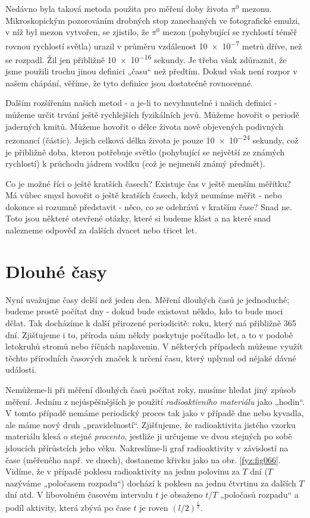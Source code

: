 {    Nedávno byla taková metoda použita pro měření doby života \(\pi^0\) mezonu. Mikroskopickým 
    pozorováním drobných stop zanechaných ve fotografické emulzi, v níž byl mezon vytvořen, se 
    zjistilo, že \(\pi^0\) mezon (pohybující se rychlostí téměř rovnou rychlostí světla) urazil v 
    průměru vzdálenost \num{10e-7} metrů dříve, než se rozpadl. Žil jen přibližně \num{10e-16} 
    sekundy. Je třeba však zdůraznit, že jsme použili trochu jinou definici „času“ než předtím. 
    Dokud však není rozpor v našem chápání, věříme, že tyto definice jsou dostatečně rovnocenné.
    
    Dalším rozšířením našich metod - a je-li to nevyhnutelné i našich definicí - můžeme určit 
    trvání ještě rychlejších fyzikálních jevů. Můžeme hovořit o periodě jaderných kmitů. Můžeme 
    hovořit o délce života nově objevených podivných rezonancí (částic). Jejich celková délka 
    života je pouze \num{10e-24} sekundy, což je přibližně doba, kterou potřebuje světlo 
    (pohybující se největší ze známých rychlostí) k průchodu jádrem vodíku (což je 
    nejmenší známý předmět).
    
    Co je možné říci o ještě kratších časech? Existuje čas v ještě menším měřítku? Má vůbec smysl 
    hovořit o ještě kratších časech, když neumíme měřit - nebo dokonce si rozumně představit - 
    něco, co se odehrává v kratším čase? Snad ne. Toto jsou některé otevřené otázky, které si 
    budeme klást a na které snad nalezneme odpověď za dalších dvacet nebo třicet let.
    
  \section{Dlouhé časy}
    Nyní uvažujme časy delší než jeden den. Měření dlouhých časů je jednoduché; budeme prostě 
    počítat dny - dokud bude existovat někdo, kdo to bude moci dělat. Tak docházíme k další 
    přirozené periodicitě: roku, který má přibližně \num{365} dní. Zjišťujeme i to, příroda nám 
    někdy poskytuje počítadlo let, a to v podobě letokruhů stromů nebo říčních naplavenin. V 
    některých případech můžeme využít těchto přírodních časových značek k určení času, který 
    uplynul od nějaké dávné události.
    
    Nemůžeme-li při měření dlouhých časů počítat roky, musíme hledat jiný způsob měření. Jedním z 
    nejúspěšnějších je použití \emph{radioaktivního materiálu} jako „hodin“. V tomto případě nemáme 
    periodický proces tak jako v případě dne nebo kyvadla, ale máme nový druh „pravidelností“. 
    Zjišťujeme, že radioaktivita jistého vzorku materiálu klesá o stejné \emph{procento},    
    jestliže ji určujeme ve dvou stejných po sobě jdoucích přírůstcích jeho věku. Nakreslíme-li 
    graf radioaktivity v závislostí na čase (měřeného např. ve dnech), dostaneme křivku jako na 
    obr. \ref{fyz:fig066}. Vidíme, že v případě poklesu radioaktivity na jednu polovinu za \(T\) 
    dní (\(T\) nazýváme „poločasem rozpadu“) dochází k poklesu na jednu čtvrtinu za dalších \(T\) 
    dní atd. V libovolném časovém intervalu \(t\) je obsaženo \(t/T\) „poločasů rozpadu“ a podíl 
    aktivity, která zbývá po čase \(t\) je roven \((l/2)^{\frac{t}{T}}\).

}
